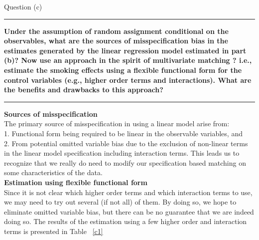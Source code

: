 \documentclass[12pt]{article}
\newcommand\question[1]{\vspace{1em}\hrule\vspace{1em}\textbf{#1}\vspace{1em}\hrule\vspace{1em}}
\begin{document}
\newpage
\begin{center}\LARGE{Question (c)}\end{center}
\question{Under the assumption of random assignment conditional on the observables, what are the sources of misspecification bias in the estimates generated by the linear regression model estimated in part (b)? Now use an approach in the spirit of multivariate matching ? i.e., estimate the smoking effects using a flexible functional form for the control variables (e.g., higher order terms and interactions). What are the benefits and drawbacks to this approach?}

\textbf{Sources of misspecification}\\
The primary source of misspecification in using a linear model arise from:\\1. Functional form being required to be linear in the observable variables, and \\2. From potential omitted variable bias due to the exclusion of non-linear terms in the linear model specification including interaction terms. This leads us to recognize that we really do need to modify our specification based matching on some characteristics of the data.\\

\textbf{Estimation using flexible functional form}\\

Since it is not clear which higher order terms and which interaction terms to use, we may need to try out several (if not all) of them. By doing so, we hope to eliminate omitted variable bias, but there can be no guarantee that we are indeed doing so. The results of the estimation using a few higher order and interaction terms is presented in Table ~\ref{c1}\\
\end{document}
